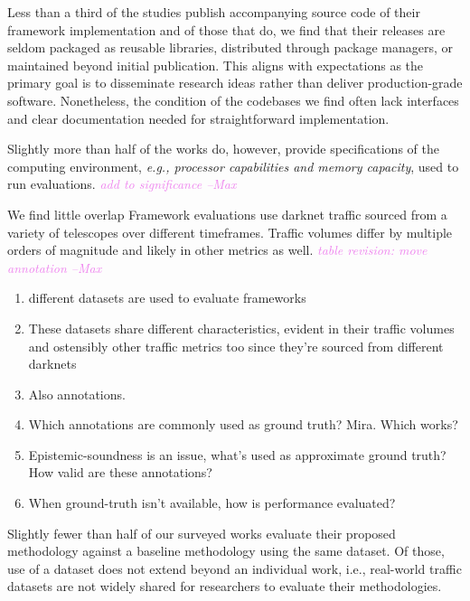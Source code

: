 \documentclass[manuscript,nonacm]{acmart}
\newcommand{\maxnote}[1]{\textit{\textcolor{violet}{#1 --Max}}}
\begin{document}
Less than a third of the studies publish accompanying source code of their framework implementation and of those that do, 
we find that their releases are seldom packaged as reusable libraries, distributed through package managers, or maintained beyond initial publication.
This aligns with expectations as the primary goal is to disseminate research ideas rather than deliver production-grade software.
Nonetheless, the condition of the codebases we find often lack interfaces and clear documentation needed for straightforward implementation.

Slightly more than half of the works do, however, provide specifications of the computing environment, \textit{e.g., processor capabilities and memory capacity}, used to run evaluations.
\maxnote{add to significance}

We find little overlap 
Framework evaluations use darknet traffic sourced from a variety of telescopes over different timeframes.
Traffic volumes differ by multiple orders of magnitude and likely in other metrics as well.
\maxnote{table revision: move annotation}

\begin{enumerate}
	\item different datasets are used to evaluate frameworks
	\item These datasets share different characteristics, evident in their traffic volumes and ostensibly other traffic metrics too since they're sourced from different darknets
	\item Also annotations. 
	\item Which annotations are commonly used as ground truth? Mira. Which works?
	\item Epistemic-soundness is an issue, what's used as approximate ground truth? How valid are these annotations?
	\item When ground-truth isn't available, how is performance evaluated?
\end{enumerate}

Slightly fewer than half of our surveyed works evaluate their proposed methodology against a baseline methodology using the same dataset.
Of those, use of a dataset does not extend beyond an individual work, i.e., real-world traffic datasets are not widely shared for researchers to evaluate their methodologies.
\end{document}

